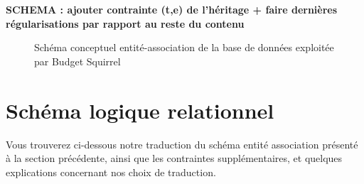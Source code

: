 \documentclass[a4paper,12pt]{article}
\begin{document}
\textbf{SCHEMA : ajouter contrainte (t,e) de l'héritage + faire dernières régularisations par rapport au reste du contenu}

\begin{figure}[!ht]
\noindent
{}
\caption{\footnotesize{Schéma conceptuel entité-association de la base de données exploitée par Budget Squirrel}}
\end{figure}

\newpage 

\section{Schéma logique relationnel}

Vous trouverez ci-dessous notre traduction du schéma entité association présenté à la section précédente, ainsi que les contraintes supplémentaires, et quelques explications concernant nos choix de traduction.
\end{document}
